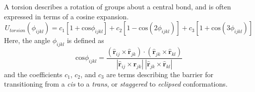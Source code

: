 A torsion describes a rotation of groups about a central bond, and is
often expressed in terms of a cosine expansion.
\begin{equation}\label{eq:torsion}
U_{torsion}(\phi_{ijkl}) = c_1[1+\mathrm{cos}\phi_{ijkl}] + c_2[1-\mathrm{cos}(2\phi_{ijkl})]+c_3[1+\mathrm{cos}(3\phi_{ijkl})]
\end{equation}
Here, the angle $\phi_{ijkl}$ is defined as
\begin{equation}\label{eq:torsion2}
\mathrm{cos}\phi_{ijkl} = \frac{(\mathbf{\hat{r}}_{ij} \times
\mathbf{\hat{r}}_{jk}) \cdot (\mathbf{\hat{r}}_{jk} \times
\mathbf{\hat{r}}_{kl})}{|\mathbf{\hat{r}}_{ij} \times
\mathbf{\hat{r}}_{jk}|~|\mathbf{\hat{r}}_{jk} \times
\mathbf{\hat{r}}_{kl}|}
\end{equation}
and the coefficients $c_1$, $c_2$, and $c_3$ are terms describing the
barrier for transitioning from a \textit{cis} to a \textit{trans}, or \textit{staggered} to
\textit{eclipsed} conformations.

